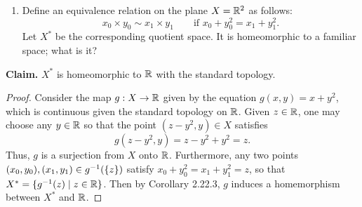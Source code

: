 \begin{solution}
  \begin{enumerate}[label={(\alph*)}, align=left, leftmargin=\parindent, listparindent=\parindent, labelwidth=0pt, itemindent=!]
    \item
      Define an equivalence relation on the plane $X = \mathbb{R}^2$ as follows:
      \begin{equation*}
        x_0 \times y_0 \sim x_1 \times y_1 \qquad \text{if } x_0 + y_0^2 = x_1 + y_1^2.
      \end{equation*}
      Let $X^*$ be the corresponding quotient space.
      It is homeomorphic to a familiar space; what is it?

  \end{enumerate}
  \noindent\textbf{Claim.} $X^*$ is homeomorphic to $\mathbb{R}$ with the standard topology.
  \begin{proof}
    Consider the map $g: X \rightarrow \mathbb{R}$ given by the equation $g(x, y) = x + y^2$, which is continuous given the standard topology on $\mathbb{R}$.
    Given $z \in \mathbb{R}$, one may choose any $y \in \mathbb{R}$ so that the point $(z - y^2, y) \in  X$ satisfies
    \begin{equation*}
      g(z - y^2, y) = z - y^2 + y^2 = z.
    \end{equation*}
    Thus, $g$ is a surjection from $X$ onto $\mathbb{R}$.
    Furthermore, any two points $(x_0, y_0), (x_1, y_1) \in g^{-1}(\{z\})$ satisfy $x_0 + y_0^2 = x_1 + y_1^2 = z$, so that $X^* = \{g^{-1}(z) \mid z \in \mathbb{R}\}$.
    Then by Corollary 2.22.3, $g$ induces a homemorphism between $X^*$ and $\mathbb{R}$.
  \end{proof}
  \bigskip


\end{solution}
